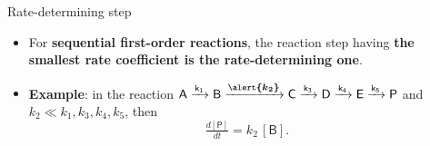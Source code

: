%
%
\begin{frame}{Rate-determining step}
	\begin{itemize}
		\item For {\bf sequential first-order reactions}, the reaction step having \alert{\bf the smallest rate coefficient is the rate-determining one}.
		\pause
		\item {\bf Example}: in the reaction 
		$\mathsf{A \xrightarrow[]{k_1} B \xrightarrow[]{\boldsymbol{\alert{k_2}}} C \xrightarrow[]{k_3} D \xrightarrow[]{k_4} E \xrightarrow[]{k_5} P}$ and 
		$k_2 \ll k_1, k_3, k_4, k_5$, then 
		\[\tfrac{d\mathsf{[P]}}{dt} = k_2 \, \mathsf{[B]}.\]
	\end{itemize}
\end{frame}
%
%
